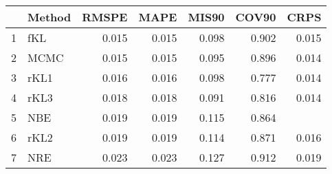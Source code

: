 \documentclass[12pt]{article}
\begin{document}
\thispagestyle{empty}
\begin{table}[ht]
\centering
\begin{tabular}{rlrrrrr}
  \hline
 & Method & RMSPE & MAPE & MIS90 & COV90 & CRPS \\ 
  \hline
1 & fKL & 0.015 & 0.015 & 0.098 & 0.902 & 0.015 \\ 
  2 & MCMC & 0.015 & 0.015 & 0.095 & 0.896 & 0.014 \\ 
  3 & rKL1 & 0.016 & 0.016 & 0.098 & 0.777 & 0.014 \\ 
  4 & rKL3 & 0.018 & 0.018 & 0.091 & 0.816 & 0.014 \\ 
  5 & NBE & 0.019 & 0.019 & 0.115 & 0.864 &  \\ 
  6 & rKL2 & 0.019 & 0.019 & 0.114 & 0.871 & 0.016 \\ 
  7 & NRE & 0.023 & 0.023 & 0.127 & 0.912 & 0.019 \\ 
   \hline
\end{tabular}
\end{table}
\end{document}
